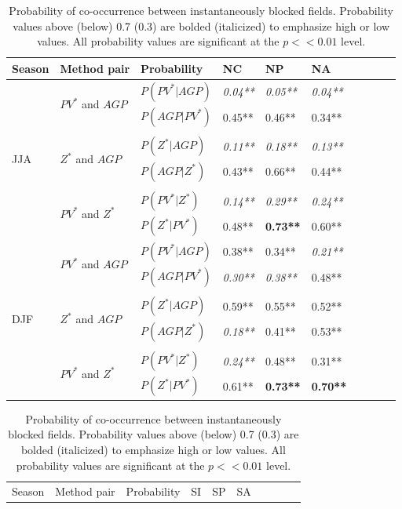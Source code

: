 \documentclass[smallextended]{svjour3}       %
\numberwithin{equation}{section}
\begin{document}
\begin{table}
\centering
\caption{Probability of co-occurrence between instantaneously blocked fields. Probability values above (below) 0.7 (0.3) are bolded (italicized) to emphasize high or low values. All probability values are significant at the $p<<0.01$ level. }
\label{probtabcol}
\begin{tabular}{|l|l|l|l|l|l|l|l|l|l|}
\hline
Season & Method pair & Probability & NC    & NP    & NA      \\ \hline
\multirow{8}{*}{JJA} 
   & \multirow{2}{*}{$PV^* $ and $AGP$}&$P(PV^*|AGP)$ & \textit{0.04**} & \textit{0.05**} & \textit{{0.04**}}  \\  
   & & $P(AGP|PV^*)$ & {0.45**} & {0.46**} & {0.34**}  \\ 
   &&&&&\\
   & \multirow{2}{*}{$Z^*$ and $AGP$} &$P(Z^*|AGP)$    & \textit{{0.11**}} & \textit{{0.18**}} & \textit{{0.13**} } \\  
   &&$P(AGP|Z^*)$   & {0.43**} & {0.66**} & {0.44**} \\ 
      &&&&&\\
      & \multirow{2}{*}{$PV^*$ and $Z^*$ } &$P(PV^*|Z^*)$    & \textit{0.14**}& \textit{0.29**}& \textit{{0.24**}} \\ 
   &&$P(Z^*|PV^*)$   & {0.48**} & \textbf{{0.73**}} & 0.60**  \\ 
  
  \hline
  \multirow{8}{*}{DJF} 
   & \multirow{2}{*}{$PV^* $ and $AGP$}&$P(PV^*|AGP)$ & {0.38**} & {0.34**} &\textit{{0.21**}}  \\
   & & $P(AGP|PV^*)$& \textit{{0.30**}} &\textit{0.38**}& {0.48**}\\ 
      &&&&&\\
   & \multirow{2}{*}{$Z^*$ and $AGP$} &$P(Z^*|AGP)$ & {0.59**} &0.55**& {0.52**} \\ 
   &&$P(AGP|Z^*)$   & \textit{{0.18**} }& {0.41**} & 0.53** \\ 
      &&&&&\\
      & \multirow{2}{*}{$PV^*$ and $Z^*$ } &$P(PV^*|Z^*)$    & \textit{0.24**} & {0.48**} & {0.31**} \\
   &&$P(Z^*|PV^*)$   & {0.61**} & \textbf{0.73**} & \textbf{0.70**}  \\   
  \hline
\end{tabular}
\begin{tabular}{|l|l|l|l|l|l|l|l|l|l|}
\hline
  Season & Method pair & Probability & SI    & SP    & SA    \\ 
  

\end{tabular}
\end{table}
\end{document}
